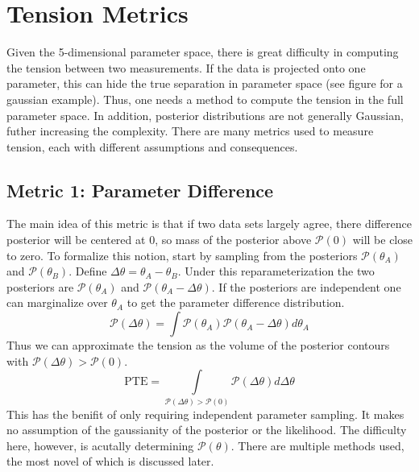 \section{Tension Metrics}
Given the 5-dimensional parameter space, there is great difficulty in computing the tension between two measurements. If the data is projected onto one parameter, this can hide the true separation in parameter space (see figure for a gaussian example). Thus, one needs a method to compute the tension in the full parameter space. In addition, posterior distributions are not generally Gaussian, futher increasing the complexity. There are many metrics used to measure tension, each with different assumptions and consequences.

\subsection{Metric 1: Parameter Difference}
The main idea of this metric is that if two data sets largely agree, there difference posterior will be centered at 0, so mass of the posterior above $\mathcal{P}(0)$ will be close to zero. To formalize this notion, start by sampling from the posteriors $\mathcal{P}(\theta_A)$ and $\mathcal{P}(\theta_B)$.
Define $\Delta\theta = \theta_A - \theta_B$. Under this reparameterization the two posteriors are $\mathcal{P}(\theta_A)$ and $\mathcal{P}(\theta_A-\Delta\theta)$. If the posteriors are independent one can marginalize over $\theta_A$ to get the parameter difference distribution.
\begin{equation}
    \mathcal{P}(\Delta\theta) = \int \mathcal{P}(\theta_A)\mathcal{P}(\theta_A - \Delta\theta) d\theta_A
\end{equation}
Thus we can approximate the tension as the volume of the posterior contours with $\mathcal{P}(\Delta\theta)>\mathcal{P}(0)$.
\begin{equation}
    \mathrm{PTE} = \int\limits_{\mathcal{P}(\Delta\theta)>\mathcal{P}(0)}\mathcal{P}(\Delta\theta) d\Delta\theta
\end{equation}
This has the benifit of only requiring independent parameter sampling. It makes no assumption of the gaussianity of the posterior or the likelihood. The difficulty here, however, is acutally determining $\mathcal{P}(\theta)$. There are multiple methods used, the most novel of which is discussed later.

